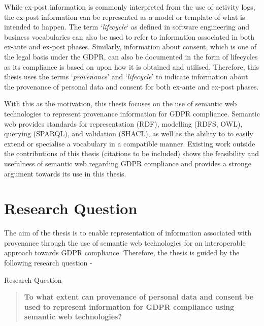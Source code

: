 While ex-post information is commonly interpreted from the use of activity logs, the ex-post information can be represented as a model or template of what is intended to happen. The term `\textit{lifecycle}` as defined in software engineering and business vocabularies can also be used to refer to information associated in both ex-ante and ex-post phases. Similarly, information about consent, which is one of the legal basis under the GDPR,  can also be documented in the form of lifecycles as its compliance is based on upon how it is obtained and utilised. Therefore, this thesis uses the terms `\textit{provenance}' and `\textit{lifecycle}' to indicate information about the provenance of personal data and consent for both ex-ante and ex-post phases.

With this as the motivation, this thesis focuses on the use of semantic web technologies to represent provenance information for GDPR compliance. Semantic web provides standards for representation (RDF), modelling (RDFS, OWL), querying (SPARQL), and validation (SHACL), as well as the ability to to easily extend or specialise a vocabulary in a compatible manner. Existing work outside the contributions of this thesis (citations to be included) shows the feasibility and usefulness of semantic web regarding GDPR compliance and provides a stronge argument towards its use in this thesis.

\section{Research Question}
The aim of the thesis is to enable representation of information associated with provenance through the use of semantic web technologies for an interoperable approach towards GDPR compliance. Therefore, the thesis is guided by the following research question -
\begin{framed}
\small{Research Question}
\begin{quote}
\textbf{To what extent can provenance of personal data and consent be used to represent information for GDPR compliance using semantic web technologies?}
\end{quote}
\end{framed}

